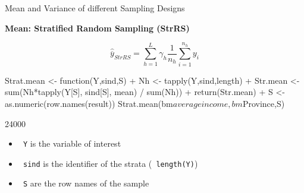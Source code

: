 \documentclass[11pt,german,hideothersubsections]{beamer}
\newcommand{\R}[1]{{\tt \color{blue}  #1}}
\begin{document}
\begin{frame}[fragile]{Mean and Variance} {of different Sampling Designs}
\vspace{-.5cm}
\footnotesize{
\begin{center}
\textbf{Mean: Stratified Random Sampling (StrRS)}
\end{center}
\begin{equation*}
\hat{\overline{y}}_{StrRS}=\sum_{h=1}^{L}\gamma_{h}\frac{1}{n_h}\sum_{i=1}^{n_h}y_i
\end{equation*}
\vspace{.25cm}
\begin{Schunk}
\begin{Sinput}
 Strat.mean <- function(Y,sind,S){
+   Nh <- tapply(Y,sind,length)
+   Str.mean <- sum(Nh*tapply(Y[S], sind[S], mean) / sum(Nh))
+   return(Str.mean)
+ }
 S <- as.numeric(row.names(result))
 Strat.mean(bm$averageincome,bm$Province,S)
\end{Sinput}
\begin{Soutput}
[1] 24000
\end{Soutput}
\end{Schunk}
\begin{itemize}
\item \R{Y} is the variable of interest
\item \R{sind} is the identifier of the strata (\R{length(Y)})
\item \R{S} are the row names of the sample 
\end{itemize}

}
\end{frame}
\end{document}
